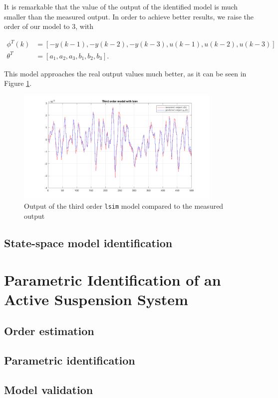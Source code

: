 \documentclass{scrartcl}
\begin{document}
It is remarkable that the value of the output of the identified model is much smaller than the measured output. In order to achieve better results, we raise the order of our model to $3$, with

\begin{align}\label{eq:arx}
 	 \phi^{T} (k) & = \left[ -y(k-1), -y(k-2), -y(k-3), u(k-1), u(k-2), u(k-3) \right] \\
 	 \theta^T & = \left[ a_1, a_2, a_3, b_1, b_2, b_3\right] .
\end{align}

This model approaches the real output values much better, as it can be seen in Figure \ref{fig:output_lsim3}.

\begin{figure}[h]
	\centering
	\includegraphics[height=5.5cm]{figures/output_lsim3.png}
	\caption{Output of the third order \texttt{lsim} model compared to the measured output}\label{fig:output_lsim3}
\end{figure}


\newpage
\subsection{State-space model identification}

\newpage
\section{Parametric Identification of an Active Suspension System}

\newpage
\subsection{Order estimation}

\newpage
\subsection{Parametric identification}

\newpage
\subsection{Model validation}
\end{document}

